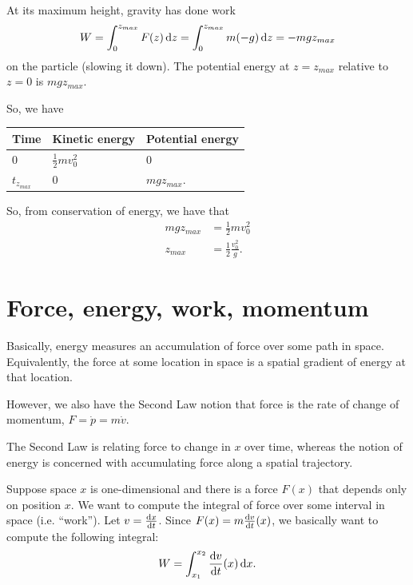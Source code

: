 \begin{enumerate}
  At its maximum height, gravity has done work
  \begin{align*}
    W = \int_0^{z_{max}} F(z) \dz = \int_0^{z_{max}} m(-g) \dz = -mgz_{max}
  \end{align*}
  on the particle (slowing it down). The potential energy at $z = z_{max}$ relative to $z = 0$ is
  $mgz_{max}$.

  So, we have\\
  \begin{tabular}{l|l|l|}
    Time         & Kinetic energy      & Potential energy \\
    \hline
    $0$          & $\frac{1}{2}mv_0^2$ & 0\\
    $t_{z_{max}}$ & $0$                 & $mgz_{max}$.
  \end{tabular}

  So, from conservation of energy, we have that
  \begin{align*}
    mgz_{max}         &= \frac{1}{2}mv_0^2  \\
    z_{max}           &= \frac{1}{2}\frac{v_0^2}{g}.
  \end{align*}



\end{enumerate}



\section{Force, energy, work, momentum}

Basically, energy measures an accumulation of force over some path in space. Equivalently, the force
at some location in space is a spatial gradient of energy at that location.

However, we also have the Second Law notion that force is the rate of change of momentum,
$F = \dot{p} = m\dot{v}$.

The Second Law is relating force to change in $x$ over time, whereas the notion of energy is
concerned with accumulating force along a spatial trajectory.

Suppose space $x$ is one-dimensional and there is a force $F(x)$ that depends only on position
$x$. We want to compute the integral of force over some interval in space (i.e. ``work''). Let
$v = \dxdt$. Since $F(x) = m\dvdt(x)$, we basically want to compute the following integral:
\begin{align*}
  W = \int_{x_1}^{x_2} \dvdt(x) \dx.
\end{align*}

